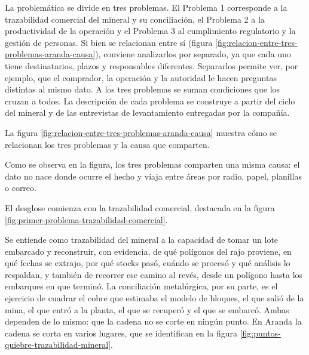 \documentclass[subdoc]{../../comun/overfore}
\begin{document}
La problemática se divide en tres problemas. El Problema 1 corresponde a la trazabilidad comercial del mineral y su conciliación, el Problema 2 a la productividad de la operación y el Problema 3 al cumplimiento regulatorio y la gestión de personas. Si bien se relacionan entre sí (figura \ref{fig:relacion-entre-tres-problemas-aranda-causa}), conviene analizarlos por separado, ya que cada uno tiene destinatarios, plazos y responsables diferentes. Separarlos permite ver, por ejemplo, que el comprador, la operación y la autoridad le hacen preguntas distintas al mismo dato. A los tres problemas se suman condiciones que los cruzan a todos. La descripción de cada problema se construye a partir del ciclo del mineral y de las entrevistas de levantamiento entregadas por la compañía.

La figura \ref{fig:relacion-entre-tres-problemas-aranda-causa} muestra cómo se relacionan los tres problemas y la causa que comparten.

Como se observa en la figura, los tres problemas comparten una misma causa: el dato no nace donde ocurre el hecho y viaja entre áreas por radio, papel, planillas o correo.

El desglose comienza con la trazabilidad comercial, destacada en la figura \ref{fig:primer-problema-trazabilidad-comercial}.

Se entiende como trazabilidad del mineral a la capacidad de tomar un lote embarcado y reconstruir, con evidencia, de qué polígonos del rajo proviene, en qué fechas se extrajo, por qué stocks pasó, cuándo se procesó y qué análisis lo respaldan, y también de recorrer ese camino al revés, desde un polígono hasta los embarques en que terminó. La conciliación metalúrgica, por su parte, es el ejercicio de cuadrar el cobre que estimaba el modelo de bloques, el que salió de la mina, el que entró a la planta, el que se recuperó y el que se embarcó. Ambas dependen de lo mismo: que la cadena no se corte en ningún punto. En Aranda la cadena se corta en varios lugares, que se identifican en la figura \ref{fig:puntos-quiebre-trazabilidad-mineral}.
\end{document}
